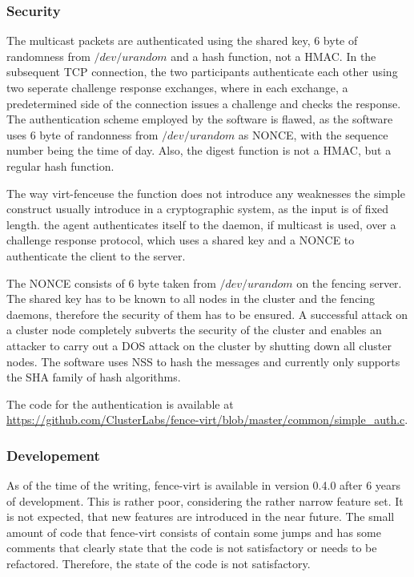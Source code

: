 \subsubsection{Security} 
The multicast packets are authenticated using the shared key, 6 byte of
randomness from $/dev/urandom$ and a hash function, not a \ac{HMAC}.
In the subsequent \ac{TCP} connection, the two participants authenticate each other using
two seperate challenge response exchanges, where in each exchange, a predetermined
side of the connection issues a challenge and checks the response.
The authentication scheme employed by the software is flawed, as
the software uses 6 byte of randonness from $/dev/urandom$ as \ac{NONCE},
with the sequence number being the time of day. Also, the digest function
is not a \ac{HMAC}, but a regular hash function.

The way virt-fenceuse the function does not introduce any weaknesses the simple construct
usually introduce in a cryptographic system, as the input is of fixed length.
the agent authenticates itself to the daemon, if multicast is used,
over a challenge response protocol, which uses a shared key and a \ac{NONCE}
to authenticate the client to the server. 

The \ac{NONCE} consists of 6 byte taken from $/dev/urandom$
on the fencing server. The shared key has to be known to
all nodes in the cluster and the fencing daemons, therefore the
security of them has to be ensured. A successful attack on a cluster node
completely subverts the security of the cluster and enables an
attacker to carry out a DOS attack on the cluster by shutting down
all cluster nodes. The software uses \ac{NSS} to hash the messages
and currently only supports the \ac{SHA} family of hash algorithms.

The code for the authentication is available at \url{https://github.com/ClusterLabs/fence-virt/blob/master/common/simple_auth.c}.

\subsubsection{Developement}
As of the time of the writing, fence-virt is available in version 0.4.0 after
6 years of development. This is rather poor, considering the rather narrow feature
set. It is not expected, that new features are introduced in the near future.
The small amount of code that fence-virt consists of contain some jumps
and has some comments that clearly state that the code is not satisfactory
or needs to be refactored. Therefore, the state of the code is not satisfactory.
